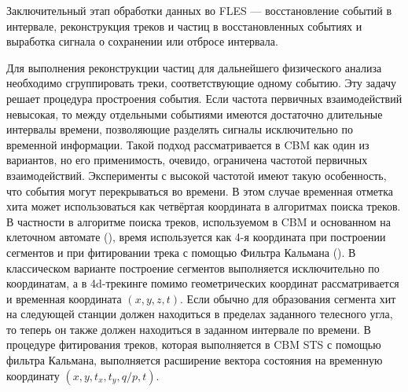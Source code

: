 Заключительный этап обработки данных во FLES --- восстановление событий в интервале, реконструкция треков и частиц в восстановленных событиях и выработка сигнала о сохранении или отбросе интервала.

Для выполнения реконструкции частиц для дальнейшего физического анализа необходимо сгруппировать треки, соответствующие одному событию. Эту задачу решает процедура простроения события.
Если частота первичных взаимодействий невысокая, то между отдельными событиями имеются достаточно длительные интервалы времени, позволяющие разделять сигналы исключительно по временной информации. Такой подход рассматривается в CBM как один из вариантов, но его применимость, очевидо, ограничена частотой первичных взаимодействий.
Эксперименты с высокой частотой имеют такую особенность, что события могут перекрываться во времени. В этом случае временная отметка хита может использоваться как четвёртая координата в алгоритмах поиска треков.
В частности в алгоритме поиска треков, используемом в CBM и основанном на клеточном автомате (\cite{}), время используется как 4-я координата при построении сегментов и при фитировании трека с помощью Фильтра Кальмана (\cite{}).
В классическом варианте построение сегментов выполняется исключительно по координатам, а в 4d-трекинге помимо геометрических координат рассматривается и временная координата $(x, y, z, t)$. Если обычно для образования сегмента хит на следующей станции должен находиться в пределах заданного телесного угла, то теперь он также должен находиться в заданном интервале по времени.
В процедуре фитирования треков, которая выполняется в CBM STS с помощью фильтра Кальмана, выполняется расширение вектора состояния на временную координату $(x, y, t_{x}, t_{y}, q/p, t)$.

